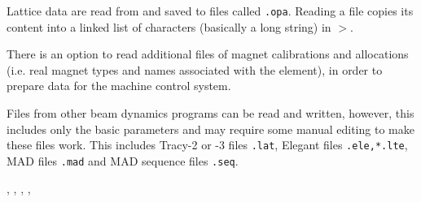 \documentclass[12pt]{article}
\newcommand\code[1]{{\tt #1}}
\newcommand\guico[1]{{\color{blue}\code{#1}}}
\newcommand{\grcod}[2]{\opagui{#1}$>$\guico{#2}}
\newcommand{\opagui}[1]{\colorbox{blue!20}{{\color{black}\code{#1}}}}
\newcommand{\opauni}[1]{\colorbox{orange!30}{{\color{black}\code{#1}}}}
\newcommand{\ouni}[1]{\hyperref[#1]{\opauni{#1}}}
\newcommand{\uses}[1]{\flushleft {\bf Uses:} #1}
\newcommand{\desc}[1]{#1}
\begin{document}
\desc{Lattice data are read from and saved to files called \code{*.opa}. Reading a file copies its content into a linked list of characters (basically a long string) in \grcod{opamenu}{ReadFile}.

There is an option to read additional files of magnet calibrations and allocations (i.e. real magnet types and names associated with the element), in order to prepare data for the machine control system.

Files from other beam dynamics programs can be read and written, however, this includes only the basic parameters and may require some manual editing to make these files work. This includes Tracy-2 or -3 files \code{*.lat}, Elegant files \code{*.ele,*.lte}, MAD files \code{*.mad} and MAD sequence files \code{*.seq}.
}

\uses{\ouni{globlib}, \ouni{editorlib}, \ouni{varlib}, \ouni{mathlib}, \ouni{comauxlib}}
\end{document}
